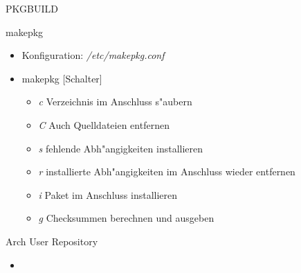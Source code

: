 \begin{slide}{PKGBUILD}
	
\end{slide}

\begin{slide}{makepkg}
	\begin{itemize}
		\item{Konfiguration: \textit{/etc/makepkg.conf}}
		\item{makepkg [Schalter]
			\begin{itemize}
				\item{\textit{c} Verzeichnis im Anschluss s"{a}ubern}
				\item{\textit{C} Auch Quelldateien entfernen}
				\item{\textit{s} fehlende Abh"{a}ngigkeiten installieren}
				\item{\textit{r} installierte Abh"{a}ngigkeiten im Anschluss
					wieder entfernen}
				\item{\textit{i} Paket im Anschluss installieren}
				\item{\textit{g} Checksummen berechnen und ausgeben}
			\end{itemize}
		}
	\end{itemize}
\end{slide}

\begin{slide}{Arch User Repository}
	\begin{itemize}
		\item{}
	\end{itemize}
\end{slide}

